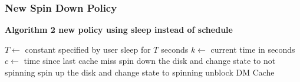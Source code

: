 \documentclass{beamer}
\begin{document}
\begin{frame}
    \frametitle{New Spin Down Policy}
    \bf Algorithm 2 \rm new policy using sleep instead of schedule
    \algrenewcommand{}
    \begin{algorithmic}[1]
	    \State $T\gets$ constant specified by user
		\State sleep for $T$ seconds
		    \State $k\gets$ current time in seconds
		    \State $c\gets$ time since last cache miss
			\State spin down the disk and change state to not spinning
		    \EndIf
		\Else {}
			\State spin up the disk and change state to spinning
			\State unblock DM Cache
		    \EndIf
		\EndIf
	    \EndWhile
	\EndProcedure
    \end{algorithmic}
\end{frame}
\end{document}
